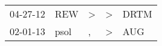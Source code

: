 \begin{supertabular}{p{0.07\textwidth}p{0.06\textwidth}p{0.02\textwidth}p{0.02\textwidth}p{0.06\textwidth}}
 04-27-12\textsuperscript{} &   REW\textsuperscript{} &  \textgreater &  \textgreater &  DRTM\textsuperscript{} \\
 02-01-13\textsuperscript{} &  psol\textsuperscript{} &             , &  \textgreater &   AUG\textsuperscript{} \\
\end{supertabular}
